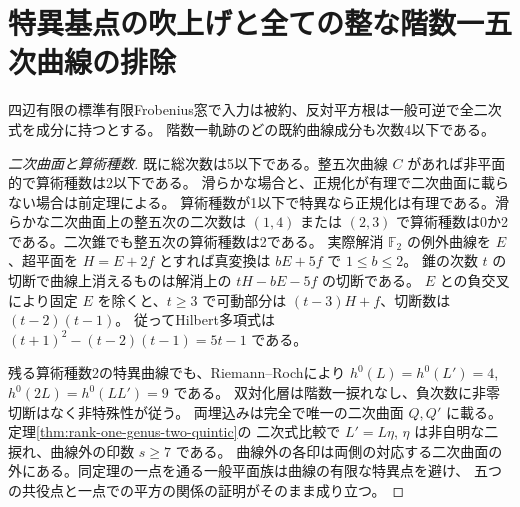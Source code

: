 \section{特異基点の吹上げと全ての整な階数一五次曲線の排除}
\label{sec:rank-one-singular-quintics}
\begin{theorem}\label{thm:rank-one-singular-quintics}
四辺有限の標準有限Frobenius窓で入力は被約、反対平方根は一般可逆で全二次式を成分に持つとする。
階数一軌跡のどの既約曲線成分も次数4以下である。
\end{theorem}
\begin{proof}[二次曲面と算術種数]
既に総次数は5以下である。整五次曲線 $C$ があれば非平面的で算術種数は2以下である。
滑らかな場合と、正規化が有理で二次曲面に載らない場合は前定理による。
算術種数が1以下で特異なら正規化は有理である。滑らかな二次曲面上の整五次の二次数は
$(1,4)$ または $(2,3)$ で算術種数は0か2である。二次錐でも整五次の算術種数は2である。
実際解消 $\mathbb F_2$ の例外曲線を $E$、超平面を $H=E+2f$ とすれば真変換は $bE+5f$ で $1\le b\le2$。
錐の次数 $t$ の切断で曲線上消えるものは解消上の $tH-bE-5f$ の切断である。
$E$ との負交叉により固定 $E$ を除くと、$t\ge3$ で可動部分は $(t-3)H+f$、切断数は $(t-2)(t-1)$。
従ってHilbert多項式は $(t+1)^2-(t-2)(t-1)=5t-1$ である。

残る算術種数2の特異曲線でも、Riemann--Rochにより $h^0(L)=h^0(L')=4$, $h^0(2L)=h^0(LL')=9$ である。
双対化層は階数一捩れなし、負次数に非零切断はなく非特殊性が従う。
両埋込みは完全で唯一の二次曲面 $Q,Q'$ に載る。定理\ref{thm:rank-one-genus-two-quintic}の
二次式比較で $L'=L\eta$, $\eta$ は非自明な二捩れ、曲線外の印数 $s\ge7$ である。
曲線外の各印は両側の対応する二次曲面の外にある。同定理の一点を通る一般平面族は曲線の有限な特異点を避け、
五つの共役点と一点での平方の関係の証明がそのまま成り立つ。
\end{proof}
